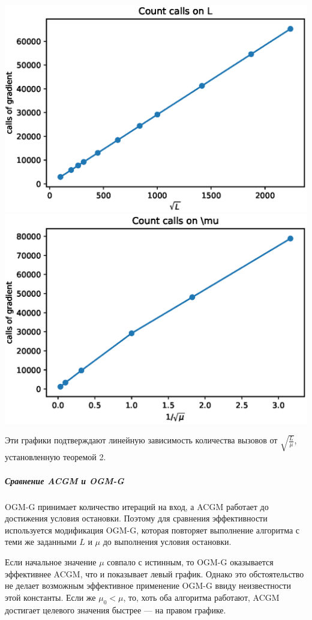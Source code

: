 \documentclass{crm-article}
\begin{document}
\noindent
\includegraphics[scale=0.5]{plots/acgm_l.eps}
\includegraphics[scale=0.5]{plots/acgm_r.eps}

Эти графики подтверждают линейную зависимость количества вызовов от $\sqrt{\frac{L}{\mu}}$, установленную теоремой 2.

\subparagraph{Сравнение ACGM и OGM-G}

OGM-G принимает количество итераций на вход, а ACGM работает до достижения условия остановки. Поэтому для сравнения эффективности используется модификация OGM-G, которая повторяет выполнение алгоритма с теми же заданными $L$ и $\mu$ до выполнения условия остановки.

Если начальное значение $\mu$ совпало с истинным, то OGM-G оказывается эффективнее ACGM, что и показывает левый график. Однако это обстоятельство не делает возможным эффективное применение OGM-G ввиду неизвестности этой константы. Если же $\mu_0<\mu$, то, хоть оба алгоритма работают, ACGM достигает целевого значения быстрее --- на правом графике.
\end{document}
